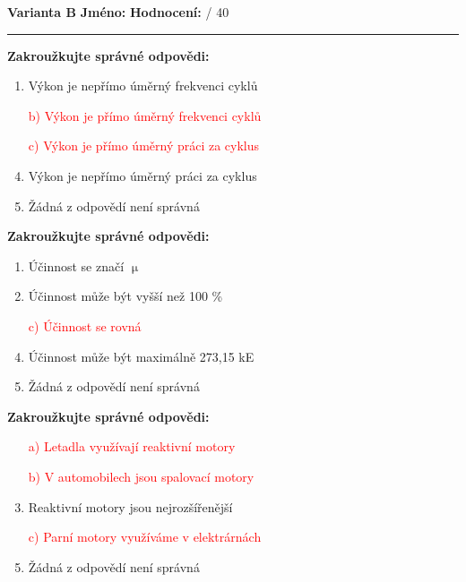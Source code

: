 \documentclass[../main.tex]{subfiles}
\begin{document}
\pagestyle{empty}

\textbf{Varianta B}
\hfill
\textbf{Jméno:}
\tecky{6cm}
\hspace{0.5cm}
\textbf{Hodnocení:}
\tecky{0.5cm}
{/}
{40}
\vspace{0.25cm}
\hrule
\vspace{0.25cm}

\begin{enumerate}[label={\textbf{\arabic*.}}]
\begin{minipage}{0.45\textwidth}
    \item \textbf{Zakroužkujte správné odpovědi:}
        \begin{enumerate}[label={\alph*)}, itemsep=0pt, topsep=0.15cm]
            \item {Výkon je nepřímo úměrný frekvenci cyklů}
            \item[\textcolor{red}{b)}] \textcolor{red}{{Výkon je přímo úměrný frekvenci cyklů}}
            \item[\textcolor{red}{c)}] \textcolor{red}{{Výkon je přímo úměrný práci za cyklus}}
            \item {Výkon je nepřímo úměrný práci za cyklus}
            \item {Žádná z odpovědí není správná}
        \end{enumerate}

    \item \textbf{Zakroužkujte správné odpovědi:}
        \begin{enumerate}[label={\alph*)}, itemsep=0pt, topsep=0.15cm]
            \item {Účinnost se značí \(\upmu\)}
            \item {Účinnost může být vyšší než 100 \%}
            \item[\textcolor{red}{c)}] \textcolor{red}{{Účinnost se rovná }}
            \item {Účinnost může být maximálně 273,15 kE}
            \item {Žádná z odpovědí není správná}
        \end{enumerate}

    \item \textbf{Zakroužkujte správné odpovědi:}
        \begin{enumerate}[label={\alph*)}, itemsep=0pt, topsep=0.15cm]
            \item[\textcolor{red}{a)}] \textcolor{red}{{Letadla využívají reaktivní motory}}
            \item[\textcolor{red}{b)}] \textcolor{red}{{V automobilech jsou spalovací motory}}
            \item {Reaktivní motory jsou nejrozšířenější}
            \item[\textcolor{red}{c)}] \textcolor{red}{{Parní motory využíváme v elektrárnách}}
            \item {Žádná z odpovědí není správná}
        \end{enumerate}


\end{minipage}
\end{enumerate}
\end{document}
